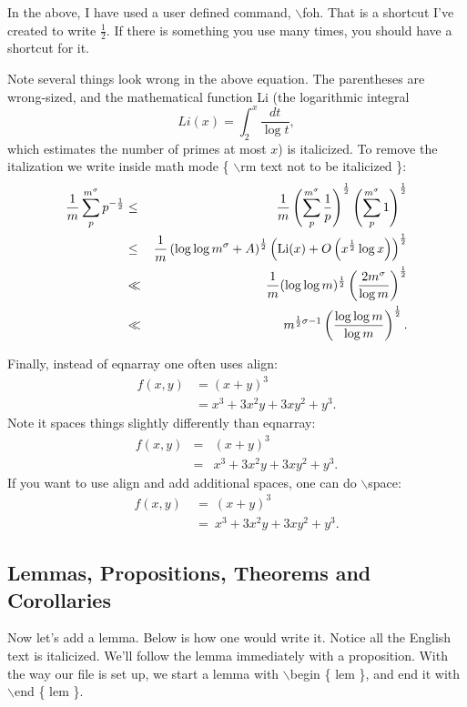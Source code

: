 \documentclass[12pt,reqno]{amsart}
\newcommand{\foh}{\frac{1}{2}}  %
\numberwithin{equation}{section}
\begin{document}
In the above, I have used a user defined command, $\backslash$foh.
That is a shortcut I've created to write $\frac{1}{2}$. If there
is something you use many times, you should have a shortcut for
it.

Note several things look wrong in the above equation. The
parentheses are wrong-sized, and the mathematical function Li (the
logarithmic integral \begin{equation} Li(x) = \int_2^x
\frac{dt}{\log t}, \end{equation} which estimates the number of
primes at most $x$) is italicized. To remove the italization we
write inside math mode \{ $\backslash$rm text not to be italicized
\}:
\begin{eqnarray}
\frac{1}{m}\sum_p^{m^\sigma} p^{-\foh} & \le & \frac{1}{m} \left(
\sum_p^{m^\sigma} \frac{1}{p}\right)^{\foh} \left(
\sum_p^{m^\sigma} 1\right)^{\foh} \nonumber\\ & \le & \frac{1}{m}
\left(\log \log m^{\sigma} + A\right)^{\foh} \left({\rm Li}(x) +
O\left(x^{\foh} \log x\right)\right)^{\foh} \nonumber\\ & \ll &
\frac{1}{m} (\log \log m)^{\foh} \left(\frac{2m^{\sigma}}{\log
m}\right)^{\foh} \nonumber\\ & \ll & m^{\foh \sigma - 1}
\left(\frac{\log \log m}{\log m}\right)^{\foh}.
\end{eqnarray}

Finally, instead of eqnarray one often uses align:
\begin{align} f(x,y) & = (x+y)^3 \nonumber\\ & = x^3 + 3x^2y + 3xy^2 + y^3.
\end{align} Note it spaces things slightly differently than
eqnarray:
\begin{eqnarray} f(x,y) & = & (x+y)^3 \nonumber\\ & = & x^3 + 3x^2y + 3xy^2 + y^3.
\end{eqnarray} If you want to use align and add additional spaces,
one can do $\backslash$space: \begin{align} f(x,y) &\ =\ (x+y)^3
\nonumber\\ &\ =\ x^3 + 3x^2y + 3xy^2 + y^3.
\end{align}

\subsection{Lemmas, Propositions, Theorems and Corollaries}

Now let's add a lemma. Below is how one would write it. Notice all
the English text is italicized. We'll follow the lemma immediately
with a proposition. With the way our file is set up, we start a
lemma with $\backslash$begin \{ lem \}, and end it with
$\backslash$end \{ lem \}.
\end{document}
